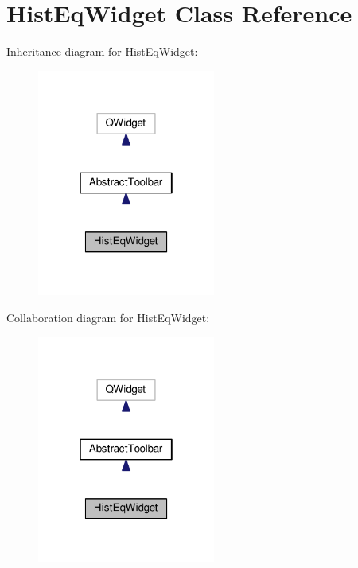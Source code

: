 \hypertarget{classHistEqWidget}{}\section{Hist\+Eq\+Widget Class Reference}
\label{classHistEqWidget}


Inheritance diagram for Hist\+Eq\+Widget\+:\nopagebreak
\begin{figure}[H]
\begin{center}
\leavevmode
\includegraphics[width=166pt]{classHistEqWidget__inherit__graph}
\end{center}
\end{figure}


Collaboration diagram for Hist\+Eq\+Widget\+:\nopagebreak
\begin{figure}[H]
\begin{center}
\leavevmode
\includegraphics[width=166pt]{classHistEqWidget__coll__graph}
\end{center}
\end{figure}
